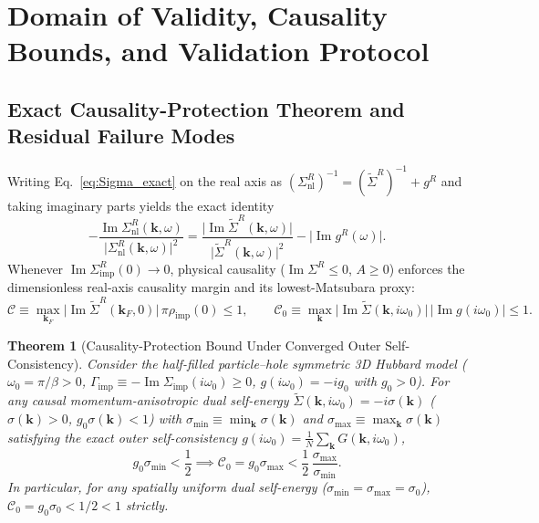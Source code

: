 \documentclass[11pt,a4paper]{article}
\numberwithin{equation}{section}
\theoremstyle{plain}
\newtheorem{theorem}{Theorem}[section]
\theoremstyle{definition}
\providecommand{\vk}{\mathbf{k}}
\providecommand{\im}{\operatorname{Im}}
\begin{document}
\section{Domain of Validity, Causality Bounds, and Validation Protocol}
\label{sec:critique}

\subsection{Exact Causality-Protection Theorem and Residual Failure Modes}
\label{sec:causality_and_failures}

Writing Eq.~\eqref{eq:Sigma_exact} on the real axis as
$(\Sigma_{\mathrm{nl}}^R)^{-1} = (\tilde{\Sigma}^R)^{-1} + g^R$ and taking imaginary
parts yields the exact identity
\begin{equation}
    -\frac{\im \Sigma_{\mathrm{nl}}^R(\vk,\omega)}{\bigl|\Sigma_{\mathrm{nl}}^R(\vk,\omega)\bigr|^2}
    = \frac{\bigl|\im \tilde{\Sigma}^R(\vk,\omega)\bigr|}{\bigl|\tilde{\Sigma}^R(\vk,\omega)\bigr|^2}
      - \bigl|\im g^R(\omega)\bigr|.
    \label{eq:causality_id}
\end{equation}
Whenever $\im\Sigma_{\mathrm{imp}}^R(0) \to 0$, physical causality ($\im\Sigma^R \le 0$,
$A \ge 0$) enforces the dimensionless real-axis causality margin and its
lowest-Matsubara proxy:
\begin{equation}
    \mathcal{C} \equiv \max_{\vk_F}\bigl|\im\tilde{\Sigma}^R(\vk_F,0)\bigr|\,\pi\rho_{\mathrm{imp}}(0) \le 1,
    \qquad
    \mathcal{C}_0 \equiv \max_{\vk}\bigl|\im\tilde{\Sigma}(\vk,i\omega_0)\bigr|\,|\im g(i\omega_0)| \le 1.
    \label{eq:causality_margins}
\end{equation}

\begin{theorem}[Causality-Protection Bound Under Converged Outer Self-Consistency]
\label{thm:causality}
Consider the half-filled particle--hole symmetric 3D Hubbard model
($\omega_0 = \pi/\beta > 0$,
$\Gamma_{\mathrm{imp}} \equiv -\im\Sigma_{\mathrm{imp}}(i\omega_0) \ge 0$,
$g(i\omega_0) = -i g_0$ with $g_0 > 0$). For any causal momentum-anisotropic dual
self-energy $\tilde{\Sigma}(\vk,i\omega_0) = -i\sigma(\vk)$ ($\sigma(\vk) > 0$,
$g_0\sigma(\vk) < 1$) with $\sigma_{\min} \equiv \min_{\vk}\sigma(\vk)$ and
$\sigma_{\max} \equiv \max_{\vk}\sigma(\vk)$ satisfying the exact outer
self-consistency $g(i\omega_0) = \frac{1}{N}\sum_{\vk} G(\vk,i\omega_0)$,
\begin{equation}
    g_0 \sigma_{\min} < \frac{1}{2}
    \implies
    \mathcal{C}_0 = g_0 \sigma_{\max} < \frac{1}{2}\,\frac{\sigma_{\max}}{\sigma_{\min}}.
    \label{eq:causality_aniso}
\end{equation}
In particular, for any spatially uniform dual self-energy ($\sigma_{\min} = \sigma_{\max} = \sigma_0$),
$\mathcal{C}_0 = g_0\sigma_0 < 1/2 < 1$ strictly.
\end{theorem}
\end{document}
